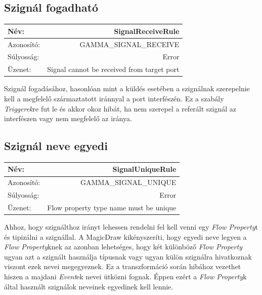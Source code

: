 \subsection{Szignál fogadható}

\begin{tabular}{ | l | r | }
	\hline
	Név: & SignalReceiveRule  \\ 
	\hline
	Azonosító: & GAMMA\_SIGNAL\_RECEIVE \\
	\hline
	Súlyosság: & Error \\  
	\hline
	Üzenet: & Signal cannot be received from target port \\
	\hline
\end{tabular}\newline
\newline
Szignál fogadásához, hasonlóan mint a küldés esetében a szignálnak szerepelnie kell a megfelelő származtatott iránnyal a port interfészén. Ez a szabály \emph{Triggerek}re fut le és akkor okoz hibát, ha nem szerepel a referált szignál az interfészen vagy nem megfelelő az iránya.

\subsection{Szignál neve egyedi}
\begin{tabular}{ | l | r | }
	\hline
	Név: & SignalUniqueRule  \\ 
	\hline
	Azonosító: & GAMMA\_SIGNAL\_UNIQUE \\
	\hline
	Súlyosság: & Error \\  
	\hline
	Üzenet: & Flow property type name must be unique \\
	\hline
\end{tabular}\newline
\newline
Ahhoz, hogy szignálthoz irányt lehessen rendelni fel kell venni egy \emph{Flow Property}t és tipizálni a szignállal. A MagicDraw kikényszeríti, hogy egyedi neve legyen a \emph{Flow Property}knek az azonban lehetséges, hogy két különböző \emph{Flow Property} ugyan azt a szignált használja típusnak vagy ugyan külön szignálra hivatkoznak viszont ezek nevei megegyeznek. Ez a transzformáció során hibához vezethet hiszen a majdani \emph{Event}ek nevei ütközni fognak. Éppen ezért a \emph{Flow Property}k által használt szignálok neveinek egyedinek kell lennie.





